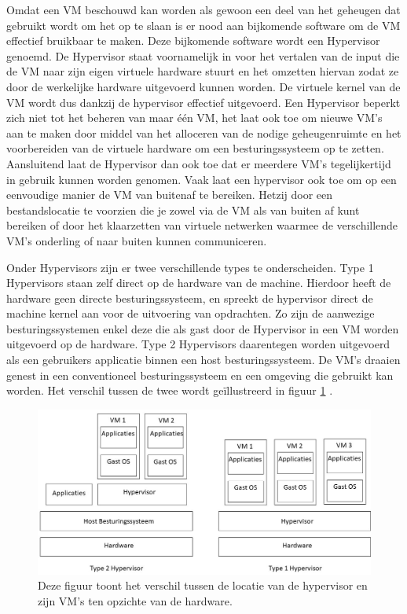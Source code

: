 Omdat een VM beschouwd kan worden als gewoon een deel van het geheugen dat gebruikt wordt om het op te slaan is er nood aan bijkomende software om de VM effectief bruikbaar te maken. Deze bijkomende software wordt een Hypervisor genoemd. De Hypervisor staat voornamelijk in voor het vertalen van de input die de VM naar zijn eigen virtuele hardware stuurt en het omzetten hiervan zodat ze door de werkelijke hardware uitgevoerd kunnen worden. De virtuele kernel van de VM wordt dus dankzij de hypervisor effectief uitgevoerd. Een Hypervisor beperkt zich niet tot het beheren van maar één VM, het laat ook toe om nieuwe VM’s aan te maken door middel van het alloceren van de nodige geheugenruimte en het voorbereiden van de virtuele hardware om een besturingssysteem op te zetten. Aansluitend laat de Hypervisor dan ook toe dat er meerdere VM’s tegelijkertijd in gebruik kunnen worden genomen. Vaak laat een hypervisor ook toe om op een eenvoudige manier de VM van buitenaf te bereiken. Hetzij door een bestandslocatie te voorzien die je zowel via de VM als van buiten af kunt bereiken of door het klaarzetten van virtuele netwerken waarmee de verschillende VM’s onderling of naar buiten kunnen communiceren.

Onder Hypervisors zijn er twee verschillende types te onderscheiden. Type 1 Hypervisors staan zelf direct op de hardware van de machine. Hierdoor heeft de hardware geen directe besturingssysteem, en spreekt de hypervisor direct de machine kernel aan voor de uitvoering van opdrachten. Zo zijn de aanwezige besturingssystemen enkel deze die als gast door de Hypervisor in een VM worden uitgevoerd op de hardware. Type 2 Hypervisors daarentegen worden uitgevoerd als een gebruikers applicatie binnen een host besturingssysteem. De VM’s draaien genest in een conventioneel besturingssysteem en een omgeving die gebruikt kan worden. Het verschil tussen de twee wordt geïllustreerd in figuur \ref{fig:hyperviors} \autocite{Yadav2018,Eder2016}.

\begin{figure}[h]
    \includegraphics[width=\linewidth]{img/hypervisors.jpg}
    \caption[Verschil tussen type 1 en type 2 hypervisor]{Deze figuur toont het verschil tussen de locatie van de hypervisor en zijn VM’s ten opzichte van de hardware.}
    \label{fig:hyperviors}
    \centering
\end{figure}

